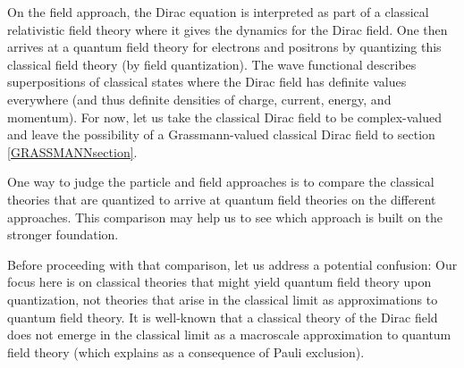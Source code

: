 \documentclass[onecolumn,secnumarabic,amsmath,amssymb,balancelastpage,nofootinbib]{article}
\begin{document}
On the field approach, the Dirac equation is interpreted as part of a classical relativistic field theory where it gives the dynamics for the Dirac field.  One then arrives at a quantum field theory for electrons and positrons by quantizing this classical field theory (by field quantization).  The wave functional describes superpositions of classical states where the Dirac field has definite values everywhere (and thus definite densities of charge, current, energy, and momentum).  For now, let us take the classical Dirac field to be complex-valued and leave the possibility of a Grassmann-valued classical Dirac field to section \ref{GRASSMANNsection}.


One way to judge the particle and field approaches is to compare the classical theories that are quantized to arrive at quantum field theories on the different approaches.  This comparison may help us to see which approach is built on the stronger foundation.

Before proceeding with that comparison, let us address a potential confusion: Our focus here is on classical theories that might yield quantum field theory upon quantization, not theories that arise in the classical limit as approximations to quantum field theory.  It is well-known that a classical theory of the Dirac field does not emerge in the classical limit as a macroscale approximation to quantum field theory (which \citealp[pg.\ 221]{duncan} explains as a consequence of Pauli exclusion).
\end{document}
